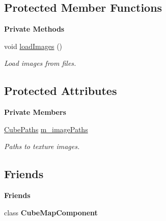 \subsection*{Protected Member Functions}
\begin{Indent}\textbf{ Private Methods}\par
\begin{DoxyCompactItemize}
\item 
\mbox{\label{classrev_1_1_cube_texture_a5317d3aaf79818b7a93eb3de12459ee8}} 
void \mbox{\hyperlink{classrev_1_1_cube_texture_a5317d3aaf79818b7a93eb3de12459ee8}{load\+Images}} ()
\begin{DoxyCompactList}\small\item\em Load images from files. \end{DoxyCompactList}\end{DoxyCompactItemize}
\end{Indent}
\subsection*{Protected Attributes}
\begin{Indent}\textbf{ Private Members}\par
\begin{DoxyCompactItemize}
\item 
\mbox{\label{classrev_1_1_cube_texture_a3233732514d341c1889f2f88914c261d}} 
\mbox{\hyperlink{structrev_1_1_cube_paths}{Cube\+Paths}} \mbox{\hyperlink{classrev_1_1_cube_texture_a3233732514d341c1889f2f88914c261d}{m\+\_\+image\+Paths}}
\begin{DoxyCompactList}\small\item\em Paths to texture images. \end{DoxyCompactList}\end{DoxyCompactItemize}
\end{Indent}
\subsection*{Friends}
\begin{Indent}\textbf{ Friends}\par
\begin{DoxyCompactItemize}
\item 
\mbox{\label{classrev_1_1_cube_texture_afdc96aa9d22ba862b8fd719efa8bc777}} 
class {\bfseries Cube\+Map\+Component}
\end{DoxyCompactItemize}
\end{Indent}
